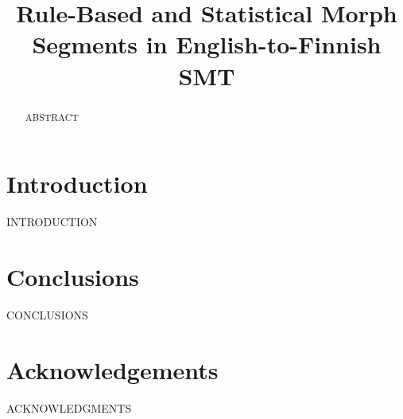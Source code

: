 \documentclass[free]{flammie}
\newif\ifcameraready
\begin{document}
\title{Rule-Based and Statistical Morph Segments in English-to-Finnish SMT}


\ifcameraready
\author{Pirinen \\
    \url{EMAIL} \\
    AFFILIATION \\
}
\fi

\maketitle
\begin{abstract}

    ABSTRACT
\end{abstract}

\section{Introduction}
\label{sec:introduction}

INTRODUCTION

\section{Conclusions}
\label{sec:conclusions}

CONCLUSIONS

\section*{Acknowledgements}

ACKNOWLEDGMENTS



\end{document}

